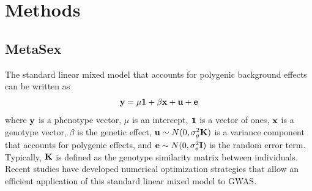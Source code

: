 \documentclass[11pt]{article}
\begin{document}
\section{Methods}

\subsection{MetaSex}

The standard linear mixed model that accounts for polygenic background effects can be written as
\begin{equation}
{\bf y} = \mu {\bf 1} + \beta {\bf x} + {\bf u} + {\bf e} 
\label{eq:standard}
\end{equation}
where ${\bf y}$ is a phenotype vector, $\mu$ is an intercept, ${\bf 1}$ is a vector of ones, ${\bf x}$ is a genotype vector, $\beta$ is the genetic effect,
${\bf u} \sim N(0, \sigma^2_g {\bf K})$ is a variance component that accounts for polygenic effects,
and ${\bf e} \sim N(0, \sigma^2_e {\bf I})$ is the random error term.
Typically, ${\bf K}$ is defined as the genotype similarity matrix between individuals.
Recent studies have developed numerical optimization strategies that allow an efficient application of this standard linear mixed model to GWAS\citep{Zhou:NatGenet:2012,Kang2010,Kang:2008bx}.
\end{document}
